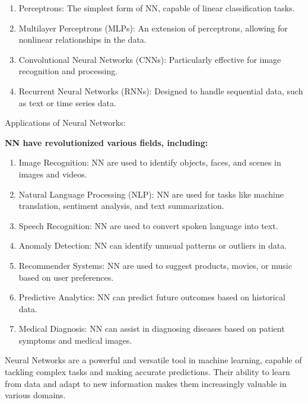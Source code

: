 \begin{enumerate}
    \item Perceptrons: The simplest form of NN, capable of linear classification tasks.

    \item Multilayer Perceptrons (MLPs): An extension of perceptrons, allowing for nonlinear relationships in the data.

    \item Convolutional Neural Networks (CNNs): Particularly effective for image recognition and processing.

    \item Recurrent Neural Networks (RNNs): Designed to handle sequential data, such as text or time series data.

\end{enumerate}
Applications of Neural Networks:

\textbf{NN have revolutionized various fields, including:}

\begin{enumerate}
    \item Image Recognition: NN are used to identify objects, faces, and scenes in images and videos.

    \item Natural Language Processing (NLP): NN are used for tasks like machine translation, sentiment analysis, and text summarization.

    \item Speech Recognition: NN are used to convert spoken language into text.

    \item Anomaly Detection: NN can identify unusual patterns or outliers in data.

    \item Recommender Systems: NN are used to suggest products, movies, or music based on user preferences.

    \item Predictive Analytics: NN can predict future outcomes based on historical data.

    \item Medical Diagnosis: NN can assist in diagnosing diseases based on patient symptoms and medical images.

\end{enumerate}
Neural Networks are a powerful and versatile tool in machine learning, capable of tackling complex tasks and making accurate predictions. Their ability to learn from data and adapt to new information makes them increasingly valuable in various domains.


